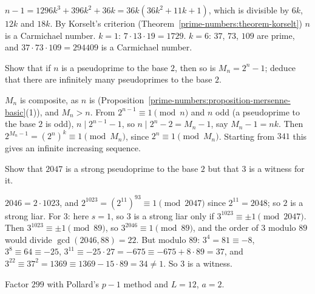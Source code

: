 \begin{solution}
$n - 1 = 1296k^3 + 396k^2 + 36k = 36k(36k^2 + 11k + 1)$, which is divisible by $6k$, $12k$ and $18k$. By Korselt's criterion (Theorem~\ref{prime-numbers:theorem-korselt}) $n$ is a Carmichael number.
$k = 1$: $7 \cdot 13 \cdot 19 = 1729$. $k = 6$: $37$, $73$, $109$ are prime, and $37 \cdot 73 \cdot 109 = 294409$ is a Carmichael number.
\end{solution}

\begin{exercise}\label{prime-numbers:exercise-pseudoprime-mersenne}
Show that if $n$ is a pseudoprime to the base $2$, then so is $M_n = 2^n - 1$; deduce that there are infinitely many pseudoprimes to the base $2$.
\end{exercise}

\begin{solution}
$M_n$ is composite, as $n$ is (Proposition~\ref{prime-numbers:proposition-mersenne-basic}(1)), and $M_n > n$. From $2^{n-1} \equiv 1 \pmod n$ and $n$ odd (a pseudoprime to the base $2$ is
odd), $n \mid 2^{n-1} - 1$, so $n \mid 2^n - 2 = M_n - 1$, say $M_n - 1 = nk$. Then $2^{M_n - 1} = (2^n)^k \equiv 1 \pmod{M_n}$, since $2^n \equiv 1 \pmod{M_n}$. Starting from $341$ this gives an
infinite increasing sequence.
\end{solution}

\begin{exercise}\label{prime-numbers:exercise-strong-pseudoprime}
Show that $2047$ is a strong pseudoprime to the base $2$ but that $3$ is a witness for it.
\end{exercise}

\begin{solution}
$2046 = 2 \cdot 1023$, and $2^{1023} = (2^{11})^{93} \equiv 1 \pmod{2047}$ since $2^{11} = 2048$; so $2$ is a strong liar. For $3$: here $s = 1$, so $3$ is a strong liar only if $3^{1023} \equiv \pm 1 \pmod{2047}$. Then
$3^{1023} \equiv \pm 1 \pmod{89}$, so $3^{2046} \equiv 1 \pmod{89}$, and the order of $3$ modulo $89$ would divide $\gcd(2046, 88) = 22$. But modulo $89$: $3^4 = 81 \equiv -8$, $3^8 \equiv 64 \equiv -25$, $3^{11} \equiv -25 \cdot 27 = -675 \equiv -675 + 8 \cdot 89 = 37$, and $3^{22} \equiv 37^2 = 1369 \equiv
1369 - 15 \cdot 89 = 34 \neq 1$. So $3$ is a witness.
\end{solution}

\begin{exercise}\label{prime-numbers:exercise-pollard}
Factor $299$ with Pollard's $p - 1$ method and $L = 12$, $a = 2$.
\end{exercise}

